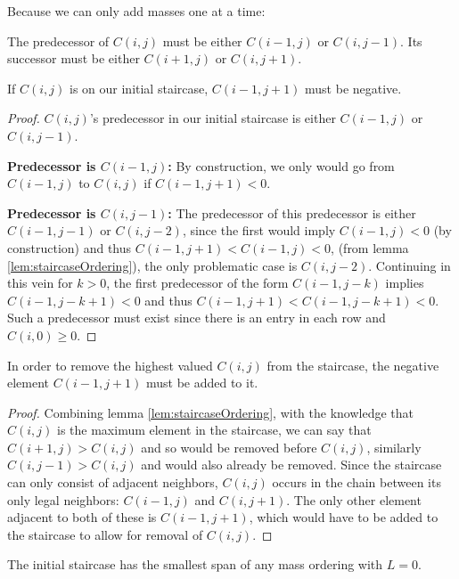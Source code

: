 Because we can only add masses one at a time:

\begin{lem} \label{lem:staircaseNeighborRestriction}
The predecessor of $C(i,j)$ must be either $C(i-1,j)$ or $C(i,j-1)$.  Its successor must be either $C(i+1,j)$ or $C(i,j+1)$.
\end{lem}

\begin{lem}
If $C(i,j)$ is on our initial staircase, $C(i-1,j+1)$ must be negative.
\end{lem}

\begin{proof}
$C(i,j)$'s predecessor in our initial staircase is either $C(i-1,j)$ or $C(i,j-1)$.  

\textbf{Predecessor is $C(i-1,j)$:} By construction, we only would go from $C(i-1,j)$ to $C(i,j)$ if $C(i-1,j+1) < 0$.

\textbf{Predecessor is $C(i,j-1)$:} The predecessor of this predecessor is either $C(i-1,j-1)$ or $C(i,j-2)$, since the first would imply $C(i-1,j) < 0$ (by construction) and thus $C(i-1,j+1) < C(i-1,j) < 0$, (from lemma \ref{lem:staircaseOrdering}), the only problematic case is $C(i,j-2)$.  Continuing in this vein for $k>0$, the first predecessor of the form $C(i-1,j-k)$ implies $C(i-1,j-k+1) < 0$ and thus $C(i-1,j+1) < C(i-1,j-k+1) < 0$. Such a predecessor must exist since there is an entry in each row and $C(i,0) \geq 0$.
\end{proof}

\begin{lem} \label{lem:staircaseDiagonal}
In order to remove the highest valued $C(i,j)$ from the staircase, the negative element $C(i-1,j+1)$ must be added to it.
\end{lem}

\begin{proof}
Combining lemma \ref{lem:staircaseOrdering}, with the knowledge that $C(i,j)$ is the maximum element in the staircase, we can say that $C(i+1,j) > C(i,j)$ and so would be removed before $C(i,j)$, similarly $C(i,j-1) > C(i,j)$ and would also already be removed.  Since the staircase can only consist of adjacent neighbors, $C(i,j)$ occurs in the chain between its only legal neighbors: $C(i-1,j)$ and $C(i,j+1)$.  The only other element adjacent to both of these is $C(i-1,j+1)$, which would have to be added to the staircase to allow for removal of $C(i,j)$.
\end{proof}

\begin{lem} \label{lem:initialStaircaseBest}
The initial staircase has the smallest span of any mass ordering with $L = 0$.
\end{lem}

